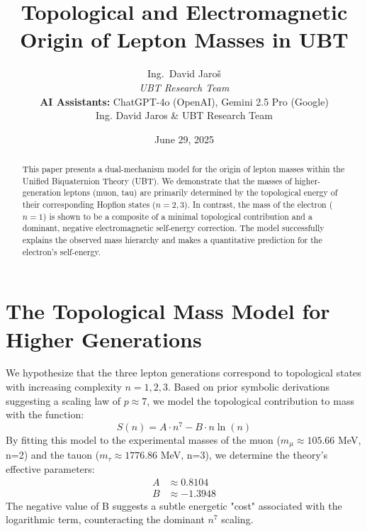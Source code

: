 \documentclass[12pt, a4paper]{article}
\title{\textbf{Topological and Electromagnetic Origin of Lepton Masses in UBT}}
\author{
Ing.~David Jaroš \\
\textit{UBT Research Team} \\
\textbf{AI Assistants:} ChatGPT-4o (OpenAI), Gemini 2.5 Pro (Google) \\
Ing. David Jaros & UBT Research Team}
\date{June 29, 2025}
\begin{document}
\maketitle

\begin{abstract}
This paper presents a dual-mechanism model for the origin of lepton masses within the Unified Biquaternion Theory (UBT). We demonstrate that the masses of higher-generation leptons (muon, tau) are primarily determined by the topological energy of their corresponding Hopfion states (\(n=2, 3\)). In contrast, the mass of the electron (\(n=1\)) is shown to be a composite of a minimal topological contribution and a dominant, negative electromagnetic self-energy correction. The model successfully explains the observed mass hierarchy and makes a quantitative prediction for the electron's self-energy.
\end{abstract}

\section{The Topological Mass Model for Higher Generations}
We hypothesize that the three lepton generations correspond to topological states with increasing complexity \(n=1, 2, 3\). Based on prior symbolic derivations suggesting a scaling law of \(p \approx 7\), we model the topological contribution to mass with the function:
\begin{equation}
    S(n) = A \cdot n^7 - B \cdot n \ln(n)
\end{equation}
By fitting this model to the experimental masses of the muon (\(m_\mu \approx 105.66\) MeV, n=2) and the tauon (\(m_\tau \approx 1776.86\) MeV, n=3), we determine the theory's effective parameters:
\begin{align}
    A &\approx 0.8104 \\
    B &\approx -1.3948
\end{align}
The negative value of B suggests a subtle energetic "cost" associated with the logarithmic term, counteracting the dominant \(n^7\) scaling.
\end{document}
